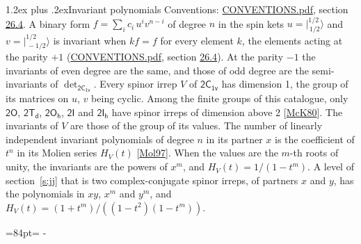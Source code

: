 \documentclass[10pt,a4paper]{article}
\makeatletter
\renewcommand\section{\@startsection{section}{1}{\z@}{-3ex plus -1ex minus -.2ex}%
  {1.2ex plus .2ex}{\normalfont\large\sffamily\bfseries\color{parttitle}}}
\newcommand{\needspace}[1]{\par\penalty-100\begingroup\dimen0=#1\relax\dimen2=\pagegoal
  \advance\dimen2-\pagetotal\ifdim\dimen0>\dimen2\relax\ifdim\dimen2>0pt\vfil\break\fi\fi
  \endgroup}
\numberwithin{equation}{section}
\newcommand{\grp}[1]{\mathsf{#1}}
\newcommand{\jm}[2]{\bigl\lvert{}^{#1}_{\,#2}\bigr\rangle}
\makeatother
\begin{document}
\section{Invariant polynomials}\label{s:invariants}
Conventions: \href{../../CONVENTIONS.pdf}{CONVENTIONS.pdf}, section \href{../../CONVENTIONS.pdf\#conv.26.4}{26.4}.
\leavevmode\label{n:local.binary.form}A binary form $f = \sum_i c_i\, u^i v^{n-i}$ of degree $n$ in the spin kets $u = \jm{1/2}{1/2}$ and $v = \jm{1/2}{-1/2}$ is invariant when $k f = f$ for every element $k$, the elements acting at the parity $+1$ (\href{../../CONVENTIONS.pdf}{CONVENTIONS.pdf}, section \href{../../CONVENTIONS.pdf\#conv.26.4}{26.4}). At the parity $-1$ the invariants of even degree are the same, and those of odd degree are the semi-invariants of $\det_{\grp{2C_{1v}}}$.
\leavevmode\label{n:function.hilbert}Every spinor irrep $V$ of $\grp{2C_{1v}}$ has dimension 1, the group of its matrices on $u$, $v$ being cyclic. Among the finite groups of this catalogue, only $\grp{2O}$, $\grp{2T_{d}}$, $\grp{2O_{h}}$, $\grp{2I}$ and $\grp{2I_{h}}$ have spinor irreps of dimension above 2 [\href{../../../REFERENCES.pdf\#ref.McK80}{McK80}]. The invariants of $V$ are those of the group of its values. \label{n:local.partner.x}The number of linearly independent invariant polynomials of degree $n$ in its partner $x$ is the coefficient of $t^n$ in its Molien series $H_V(t)$ [\href{../../../REFERENCES.pdf\#ref.Mol97}{Mol97}]. When the values are the $m$-th roots of unity, the invariants are the powers of $x^{m}$, and $H_V(t) = 1/(1 - t^{m})$. A level of section~\ref{s:jj} that is two complex-conjugate spinor irreps, of partners $x$ and $y$, has the polynomials in $xy$, $x^{m}$ and $y^{m}$, and $H_V(t) = (1 + t^{m})/((1 - t^{2})(1 - t^{m}))$.
\needspace{84pt}
\end{document}
